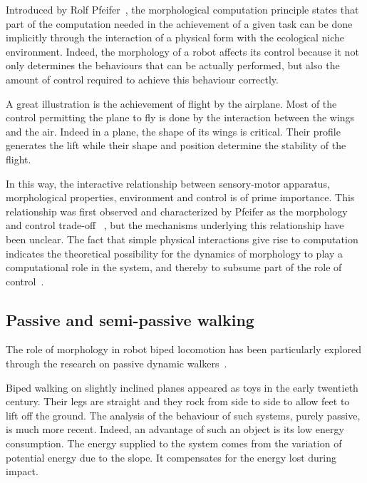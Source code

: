 Introduced by Rolf Pfeifer~\parencite{pfeifer2005morphological}, the morphological computation principle states that part of the computation needed in the achievement of a given task can be done implicitly through the interaction of a physical form with the ecological niche environment.
Indeed, the morphology of a robot affects its control because it not only determines the behaviours that can be actually performed, but also the amount of control required to achieve this behaviour correctly.

A great illustration is the achievement of flight by the airplane. Most of the control permitting the plane to fly is done by the interaction between the wings and the air. Indeed in a plane, the shape of its wings is critical. Their profile generates the lift while their shape and position determine the stability of the flight.

In this way, the interactive relationship between sensory-motor apparatus, morphological properties, environment and control is of prime importance. This relationship was first observed and characterized by Pfeifer as the morphology and control trade-off ~\parencite{pfeifer2001understanding}, but the mechanisms underlying this relationship have been unclear. The fact that simple physical interactions give rise to computation indicates the theoretical possibility for the dynamics of morphology to play a computational role in the system, and thereby to subsume part of the role of control~\parencite{paulinvestigation}.


\subsection{Passive and semi-passive walking} %
\label{sub:passive_principle}

The role of morphology in robot biped locomotion has been particularly explored through the research on passive dynamic walkers~\parencite{wisse2007passive}.

Biped walking on slightly inclined planes appeared as toys in the early twentieth century. Their legs are straight and they rock from side to side to allow feet to lift off the ground. The analysis of the behaviour of such systems, purely passive, is much more recent. Indeed, an advantage of such an object is its low energy consumption. The energy supplied to the system comes from the variation of potential energy due to the slope. It compensates for the energy lost during impact.

